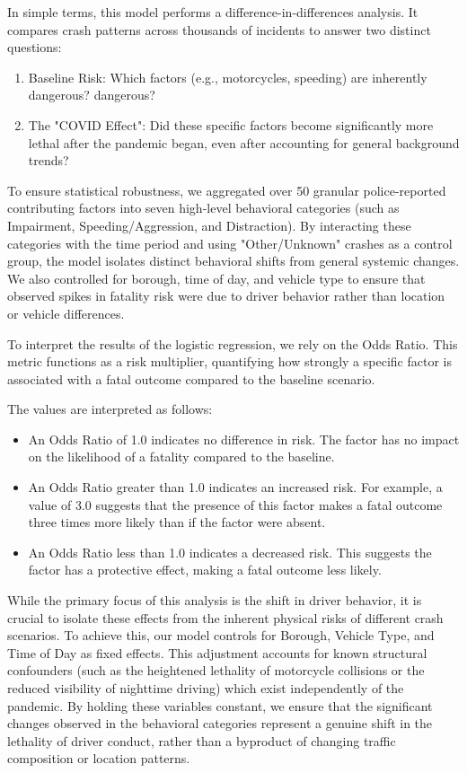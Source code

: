 \documentclass[10pt]{article}\usepackage[]{graphicx}\usepackage[]{xcolor}
\begin{document}
In simple terms, this model performs a difference-in-differences analysis. It compares crash patterns across thousands of incidents to answer two distinct questions:

\begin{enumerate}
    \item Baseline Risk: Which factors (e.g., motorcycles, speeding) are inherently dangerous? dangerous?
    \item The "COVID Effect": Did these specific factors become significantly more lethal after the pandemic began, even after accounting for general background trends?
\end{enumerate}

To ensure statistical robustness, we aggregated over 50 granular police-reported contributing factors into seven high-level behavioral categories (such as Impairment, Speeding/Aggression, and Distraction). By interacting these categories with the time period and using "Other/Unknown" crashes as a control group, the model isolates distinct behavioral shifts from general systemic changes. We also controlled for borough, time of day, and vehicle type to ensure that observed spikes in fatality risk were due to driver behavior rather than location or vehicle differences.

To interpret the results of the logistic regression, we rely on the Odds Ratio. This metric functions as a risk multiplier, quantifying how strongly a specific factor is associated with a fatal outcome compared to the baseline scenario.

The values are interpreted as follows:

\begin{itemize}
    \item An Odds Ratio of 1.0 indicates no difference in risk. The factor has no impact on the likelihood of a fatality compared to the baseline.
    \item An Odds Ratio greater than 1.0 indicates an increased risk. For example, a value of 3.0 suggests that the presence of this factor makes a fatal outcome three times more likely than if the factor were absent.
    \item An Odds Ratio less than 1.0 indicates a decreased risk. This suggests the factor has a protective effect, making a fatal outcome less likely.
\end{itemize}





While the primary focus of this analysis is the shift in driver behavior, it is crucial to isolate these effects from the inherent physical risks of different crash scenarios. To achieve this, our model controls for Borough, Vehicle Type, and Time of Day as fixed effects. This adjustment accounts for known structural confounders (such as the heightened lethality of motorcycle collisions or the reduced visibility of nighttime driving) which exist independently of the pandemic. By holding these variables constant, we ensure that the significant changes observed in the behavioral categories represent a genuine shift in the lethality of driver conduct, rather than a byproduct of changing traffic composition or location patterns.
\end{document}
